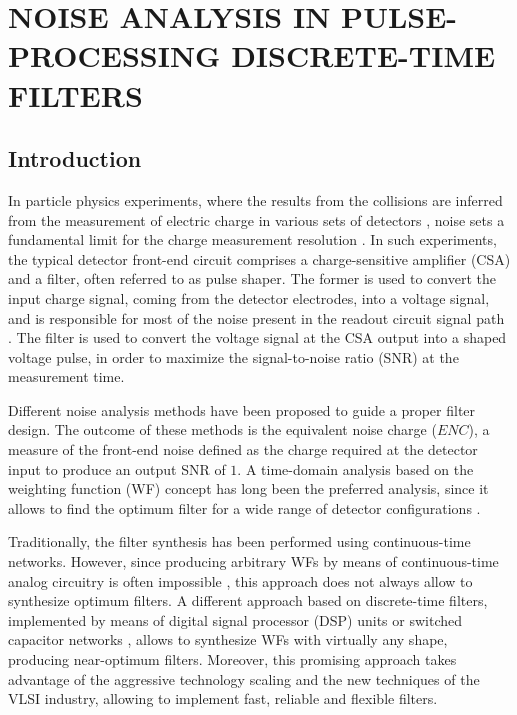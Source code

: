 \chapter{NOISE ANALYSIS IN PULSE-PROCESSING DISCRETE-TIME FILTERS\footnotemark}
\label{chapter:theoretical}
\section{Introduction}
In particle physics experiments, where the results from the collisions are inferred from the measurement of electric charge in various sets of detectors \citep{gatti101,radeka101}, noise sets a fundamental limit for the charge measurement resolution \citep{degeronimo102}. In such experiments, the typical detector \mbox{front-end} circuit comprises a \mbox{charge-sensitive} amplifier (CSA) and a filter, often referred to as pulse shaper. The former is used to convert the input charge signal, coming from the detector electrodes, into a voltage signal, and is responsible for most of the noise present in the readout circuit signal path \citep{degeronimo101,degeronimo102}. The filter is used to convert the voltage signal at the CSA output into a shaped voltage pulse, in order to maximize the \mbox{signal-to-noise} ratio (SNR) at the measurement time.

Different noise analysis methods have been proposed to guide a proper filter design. The outcome of these methods is the equivalent noise charge ($\mathit{ENC}$), a measure of the \mbox{front-end} noise defined as the charge required at the detector input to produce an output SNR  of $1$. A \mbox{time-domain} analysis based on the weighting function (WF) concept \citep{radeka101, goulding101} has long been the preferred analysis, since it allows to find the optimum filter for a wide range of detector configurations \citep{radeka104,geraci101, gatti102,pullia103,pullia105}.

Traditionally, the filter synthesis has been performed using \mbox{continuous-time} networks. However, since producing arbitrary WFs by means of \mbox{continuous-time} analog circuitry is often impossible \citep{gatti102}, this approach does not always allow to synthesize optimum filters. A different approach based on \mbox{discrete-time} filters, implemented by means of digital signal processor (DSP) units \citep{geraci103,sampietro101,jordanov101} or switched capacitor networks \citep{porro101,fiorini101,abusleme101}, allows to synthesize WFs with virtually any shape, producing \mbox{near-optimum} filters. Moreover, this promising approach takes advantage of the aggressive technology scaling and the new techniques of the VLSI industry, allowing to implement fast, reliable and flexible filters.


